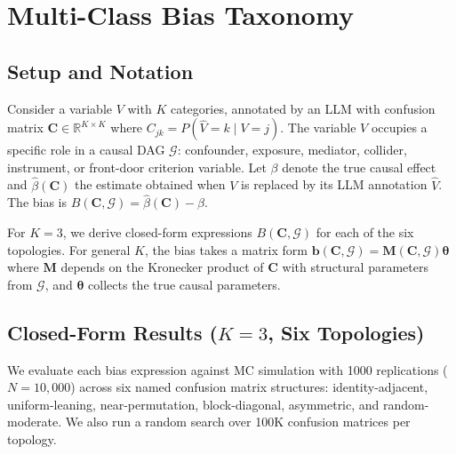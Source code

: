 \documentclass[11pt]{article}
\newcommand{\Cmat}{\mathbf{C}}
\newcommand{\bvec}{\mathbf{b}}
\newcommand{\R}{\mathbb{R}}
\begin{document}
\section{Multi-Class Bias Taxonomy}\label{sec:taxonomy}

\subsection{Setup and Notation}

Consider a variable $V$ with $K$ categories, annotated by an LLM with confusion matrix $\Cmat \in \R^{K \times K}$ where $C_{jk} = P(\hat{V}=k \mid V=j)$.
The variable $V$ occupies a specific role in a causal DAG $\mathcal{G}$: confounder, exposure, mediator, collider, instrument, or front-door criterion variable.
Let $\beta$ denote the true causal effect and $\hat{\beta}(\Cmat)$ the estimate obtained when $V$ is replaced by its LLM annotation $\hat{V}$.
The bias is $B(\Cmat, \mathcal{G}) = \hat{\beta}(\Cmat) - \beta$.

For $K=3$, we derive closed-form expressions $B(\Cmat, \mathcal{G})$ for each of the six topologies.
For general $K$, the bias takes a matrix form $\bvec(\Cmat, \mathcal{G}) = \mathbf{M}(\Cmat, \mathcal{G})\bm{\theta}$ where $\mathbf{M}$ depends on the Kronecker product of $\Cmat$ with structural parameters from $\mathcal{G}$, and $\bm{\theta}$ collects the true causal parameters.

\subsection{Closed-Form Results ($K=3$, Six Topologies)}\label{sec:closed-form}

We evaluate each bias expression against MC simulation with 1000 replications ($N=10{,}000$) across six named confusion matrix structures: identity-adjacent, uniform-leaning, near-permutation, block-diagonal, asymmetric, and random-moderate.
We also run a random search over 100K confusion matrices per topology.
\end{document}
